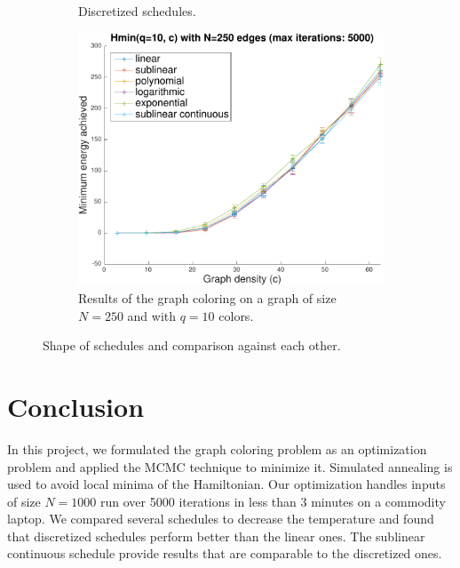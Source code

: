 \documentclass{article}
\begin{document}
\begin{figure}[h]
\begin{subfigure}[t]{.33\linewidth}
      \caption{Discretized schedules.}
      \label{fig:schedules_discretized_shape}
    \end{subfigure}%
    \begin{subfigure}[t]{.33\linewidth} %
      \centering
      \includegraphics[width=1\linewidth]{figures/schedules_evaluation.pdf}
      \caption{Results of the graph coloring on a graph of size $N=250$ and with $q=10$ colors.}
      \label{fig:schedules_evaluation}
    \end{subfigure}
    \caption{Shape of schedules and comparison against each other.}
    \label{fig:schedules}
  \end{figure}


  \section*{Conclusion}
  In this project, we formulated the graph coloring problem as an optimization problem and applied the MCMC technique to minimize it. Simulated annealing is used to avoid local minima of the Hamiltonian. Our optimization handles inputs of size $N=1000$ run over 5000 iterations in less than 3 minutes on a commodity laptop. We compared several schedules to decrease the temperature and found that discretized schedules perform better than the linear ones. The sublinear continuous schedule provide results that are comparable to the discretized ones.
  
\end{document}
